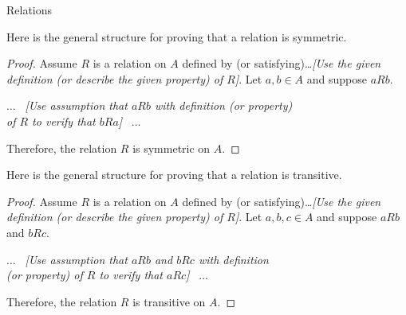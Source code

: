 \begin{section}{Relations}
\begin{skeleton}
Here is the general structure for proving that a relation is symmetric.

\begin{mdframed}[style=skeleton]
\begin{proof}
Assume $R$ is a relation on $A$ defined by (or satisfying)\ldots \emph{[Use the given definition (or describe the given property) of $R$]}.  Let $a, b\in A$ and suppose $aR b$.
\begin{center}
$\ldots$ \ \emph{[Use assumption that $aR b$ with definition (or property)\\ of $R$ to verify that $bR a$]} \ $\ldots$
\end{center}
\noindent Therefore, the relation $R$ is symmetric on $A$.
\end{proof}
\end{mdframed}
\end{skeleton}

\begin{skeleton}
Here is the general structure for proving that a relation is transitive.

\begin{mdframed}[style=skeleton]
\begin{proof}
Assume $R$ is a relation on $A$ defined by (or satisfying)\ldots \emph{[Use the given definition (or describe the given property) of $R$]}.  Let $a, b, c\in A$ and suppose $aR b$ and $bR c$.
\begin{center}
$\ldots$ \ \emph{[Use assumption that $aR b$ and $bR c$ with definition\\ (or property) of $R$ to verify that $aR c$]} \ $\ldots$
\end{center}
\noindent Therefore, the relation $R$ is transitive on $A$.
\end{proof}
\end{mdframed}
\end{skeleton}


\end{section}
